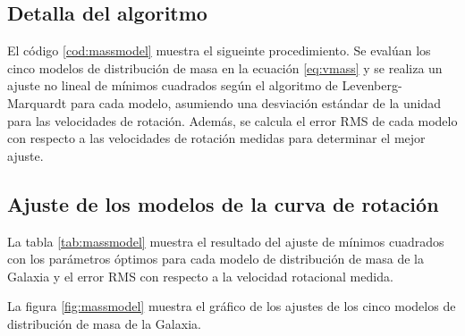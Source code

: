 \subsection{Detalla del algoritmo}

El código \ref{cod:massmodel} muestra el sigueinte procedimiento. Se evalúan los cinco modelos de distribución de masa en la ecuación \ref{eq:vmass} y se realiza un ajuste no lineal de mínimos cuadrados según el algoritmo de Levenberg-Marquardt para cada modelo, asumiendo una desviación estándar de la unidad para las velocidades de rotación. Además, se calcula el error RMS de cada modelo con respecto a las velocidades de rotación medidas para determinar el mejor ajuste.

\subsection{Ajuste de los modelos de la curva de rotación}

La tabla \ref{tab:massmodel} muestra el resultado del ajuste de mínimos cuadrados con los parámetros óptimos para cada modelo de distribución de masa de la Galaxia y el error RMS con respecto a la velocidad rotacional medida.

La figura \ref{fig:massmodel} muestra el gráfico de los ajustes de los cinco modelos de distribución de masa de la Galaxia.

\begin{table}[htpb]
	\centering
	\caption{Parámetros y error obtenido del ajuste no lineal de míminos cuadrados para los modelos de distribución de masa de la Galaxia con respecto a la velocidad rotacional medida.}\label{tab:massmodel}
\end{table}

